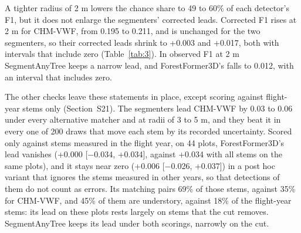 \documentclass[journal]{IEEEtran}
\begin{document}
A tighter radius of 2 m lowers the chance share to 49 to 60\% of each detector's
F1, but it does not enlarge the segmenters' corrected leads. Corrected F1 rises
at 2 m for CHM-VWF, from 0.195 to 0.211, and is unchanged for the two
segmenters, so their corrected leads shrink to +0.003 and +0.017, both with
intervals that include zero (Table~\ref{tab:3}). In observed F1 at 2 m SegmentAnyTree
keeps a narrow lead, and ForestFormer3D's falls to 0.012, with an interval
that includes zero.

The other checks leave these statements in place, except scoring against
flight-year stems only (Section~S21). The segmenters lead CHM-VWF by 0.03 to
0.06 under every alternative matcher and at radii of 3 to 5 m, and they beat it
in every one of 200 draws that move each stem by its recorded uncertainty.
Scored only against stems measured in the flight year, on 44 plots,
ForestFormer3D's lead vanishes (+0.000 [$-$0.034, +0.034], against +0.034 with all
stems on the same plots), and it stays near zero (+0.006 [$-$0.026, +0.037]) in a
post hoc variant that ignores the stems measured in other years, so that
detections of them do not count as errors. Its matching pairs 69\% of those
stems, against 35\% for CHM-VWF, and 45\% of them are understory, against 18\% of
the flight-year stems: its lead on these plots rests largely on stems that the
cut removes. SegmentAnyTree keeps its lead under both scorings, narrowly on the
cut.
\end{document}
